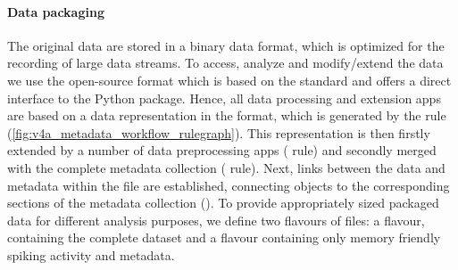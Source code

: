 \paragraph{Data packaging}
The original data are stored in a  binary data format, which is optimized for the recording of large data streams. To access, analyze and modify/extend the data we use the open-source  format which is based on the   standard and offers a direct interface to the Python  package. Hence, all data processing and extension apps are based on a data representation in the  format, which is generated by the  rule (\cref{fig:v4a_metadata_workflow_rulegraph}). This representation is then firstly extended by a number of data preprocessing apps ( rule) and secondly merged with the complete metadata collection ( rule). Next, links between the data and metadata within the  file are established, connecting  objects to the corresponding sections of the metadata collection (). To provide appropriately sized packaged data for different analysis purposes, we define two flavours of  files: a  flavour, containing the complete dataset and a  flavour containing only memory friendly spiking activity and metadata.


